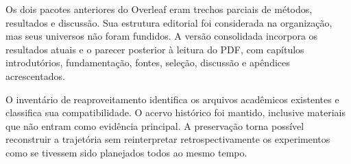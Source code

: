Os dois pacotes anteriores do Overleaf eram trechos parciais de métodos, resultados e discussão. Sua estrutura editorial foi considerada na organização, mas seus universos não foram fundidos. A versão consolidada incorpora os resultados atuais e o parecer posterior à leitura do PDF, com capítulos introdutórios, fundamentação, fontes, seleção, discussão e apêndices acrescentados.

O inventário de reaproveitamento identifica os arquivos acadêmicos existentes e classifica sua compatibilidade. O acervo histórico foi mantido, inclusive materiais que não entram como evidência principal. A preservação torna possível reconstruir a trajetória sem reinterpretar retrospectivamente os experimentos como se tivessem sido planejados todos ao mesmo tempo.
